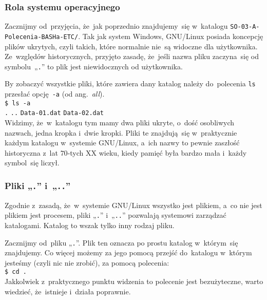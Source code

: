 \documentclass[10pt,t]{beamer}
\begin{document}
\begin{frame}
  \frametitle{Rola systemu operacyjnego}


  Zacznijmy od~przyjęcia, że~jak poprzednio znajdujemy~się w~katalogu
  \texttt{SO-03-A-Polecenia-BASHa-ETC/}. Tak jak system Windows,
  GNU/Linux posiada koncepcję plików ukrytych, czyli takich, które
  normalnie nie~są widoczne dla użytkownika. Ze~względów historycznych,
  przyjęto zasadę, że~jeśli nazwa pliku zaczyna~się od symbolu~„\texttt{.}”
  to plik jest niewidocznych od użytkownika.

  By zobaczyć wszystkie pliki, które zawiera dany katalog należy
  do~polecenia \texttt{ls} przesłać opcję~\texttt{-a}
  (od ang.~\textit{all}). \\
  \texttt{\$ ls -a} \\
  \texttt{.} \quad \texttt{..} \quad \texttt{Data-01.dat} \quad
  \texttt{Data-02.dat} \quad {} \\
  Widzimy, że~w~katalogu tym mamy dwa pliki ukryte, o~dość osobliwych
  nazwach, jedna kropka i~dwie kropki. Pliki te znajdują~się w~praktycznie
  każdym katalogu w~systemie GNU/Linux, a~ich nazwy to pewnie zaszłość
  historyczna z~lat $70$-tych XX wieku, kiedy pamięć była bardzo mała
  i~każdy symbol~się liczył.

\end{frame}





\begin{frame}
  \frametitle{Pliki „\texttt{.}” i~„\texttt{..}”}


  Zgodnie z~zasadą, że~w~systemie GNU/Linux wszystko jest plikiem, a~co nie
  jest plikiem jest procesem, pliki „\texttt{.}” i~„\texttt{..}” pozwalają
  systemowi zarządzać katalogami. Katalog to wszak tylko inny rodzaj pliku.

  Zacznijmy od~pliku „\texttt{.}”. Plik ten oznacza po prostu katalog
  w~którym~się znajdujemy. Co więcej możemy za jego pomocą przejść
  do~katalogu w~którym jesteśmy (czyli nic nie zrobić), za pomocą
  polecenia: \\
  \texttt{\$ cd .} \\
  Jakkolwiek z~praktycznego punktu widzenia to polecenie jest bezużyteczne,
  warto wiedzieć, że~istnieje i~działa poprawnie.

\end{frame}
\end{document}
